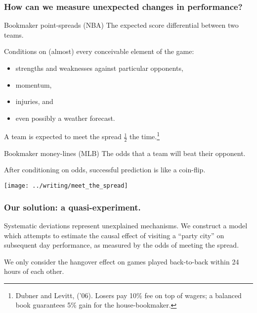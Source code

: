 \documentclass{beamer}
\begin{document}
\begin{frame}
  \frametitle{How can we measure unexpected changes in performance?}     \begin{block}{Bookmaker point-spreads (NBA)}     
    The expected score differential between two teams.

    Conditions on (almost) every conceivable element of the game:
    \begin{itemize}     \item strengths and weaknesses against particular opponents,
    \item momentum,
    \item injuries, and
    \item even possibly a weather forecast.     \end{itemize}

    A team is expected to meet the spread $\frac{1}{2}$ the time.\footnote{Dubner and Levitt, ('06). Losers pay 10\% fee on top of wagers; a balanced book guarantees 5\% gain for the house-bookmaker.}
  \end{block}
  \vspace{12pt}\begin{block}{Bookmaker money-lines (MLB)}     The odds that a team will beat their opponent.

    After conditioning on odds, successful prediction is like a coin-flip. \end{block} \end{frame}

\begin{frame}
  \centering   \texttt{[image: ../writing/meet\_the\_spread]} 
\end{frame}

\begin{frame}   \frametitle{Our solution: a quasi-experiment.}
  \begin{block}{Systematic deviations represent unexplained mechanisms.}     We construct a model which attempts to estimate the causal effect of visiting a ``party city''
    on subsequent day performance, as measured by the odds of meeting the spread.       \end{block}

  \begin{block}{}     We only consider the hangover effect on games played back-to-back within 24 hours of each other.   \end{block} \end{frame}
\end{document}
